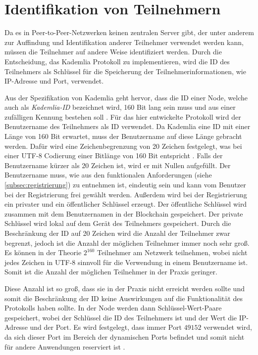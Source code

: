\section{Identifikation von Teilnehmern}
\label{subsec:identifikation_von_teilnehmern}

Da es in Peer-to-Peer-Netzwerken keinen zentralen Server gibt, der unter anderem zur Auffindung und Identifikation anderer Teilnehmer verwendet werden kann, müssen die Teilnehmer auf andere Weise identifiziert werden. Durch die Entscheidung, das Kademlia Protokoll zu implementieren, wird die ID des Teilnehmers als Schlüssel für die Speicherung der Teilnehmerinformationen, wie IP-Adresse und Port, verwendet.

Aus der Spezifikation von Kademlia geht hervor, dass die ID einer Node, welche auch als \textit{Kademlia-ID} bezeichnet wird, 160 Bit lang sein muss und aus einer zufälligen Kennung bestehen soll \parencite[S. 2]{Maymounkov_Kademlia}. Für das hier entwickelte Protokoll wird der Benutzername des Teilnehmers als ID verwendet. Da Kademlia eine ID mit einer Länge von 160 Bit erwartet, muss der Benutzername auf diese Länge gebracht werden. Dafür wird eine Zeichenbegrenzung von 20 Zeichen festgelegt, was bei einer UTF-8 Codierung einer Bitlänge von 160 Bit entspricht \parencite{rfc3629_utf-8}. Falls der Benutzername kürzer als 20 Zeichen ist, wird er mit Nullen aufgefüllt.
Der Benutzername muss, wie aus den funktionalen Anforderungen (siehe \ref{subsec:registrierung}) zu entnehmen ist, eindeutig sein und kann vom Benutzer bei der Registrierung frei gewählt werden. Außerdem wird bei der Registrierung ein privater und ein öffentlicher Schlüssel erzeugt. Der öffentliche Schlüssel wird zusammen mit dem Benutzernamen in der Blockchain gespeichert. Der private Schlüssel wird lokal auf dem Gerät des Teilnehmers gespeichert. Durch die Beschränkung der ID auf 20 Zeichen wird die Anzahl der Teilnehmer zwar begrenzt, jedoch ist die Anzahl der möglichen Teilnehmer immer noch sehr groß. Es können in der Theorie $2^{160}$ Teilnehmer am Netzwerk teilnehmen, wobei nicht jedes Zeichen in UTF-8 sinnvoll für die Verwendung in einem Benutzername ist. Somit ist die Anzahl der möglichen Teilnehmer in der Praxis geringer.

Diese Anzahl ist so groß, dass sie in der Praxis nicht erreicht werden sollte und somit die Beschränkung der ID keine Auswirkungen auf die Funktionalität des Protokolls haben sollte.
In der Node werden dann Schlüssel-Wert-Paare gespeichert, wobei der Schlüssel die ID des Teilnehmers ist und der Wert die IP-Adresse und der Port. Es wird festgelegt, dass immer Port $49152$ verwendet wird, da sich dieser Port im Bereich der dynamischen Ports befindet und somit nicht für andere Anwendungen reserviert ist \parencite[S. 20]{rfc6335_IANA_Ports}. 

